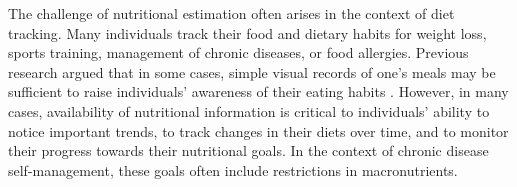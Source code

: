





The challenge of nutritional estimation often arises in the context of diet tracking. Many individuals track their food and dietary habits for weight loss, sports training, management of chronic diseases, or food allergies. Previous research argued that in some cases, simple visual records of one's meals may be sufficient to raise individuals' awareness of their eating habits \cite{}. However, in many cases, availability of nutritional information is critical to individuals' ability to notice important trends, to track changes in their diets over time, and to monitor their progress towards their nutritional goals. In the context of chronic disease self-management, these goals often include restrictions in macronutrients. 






